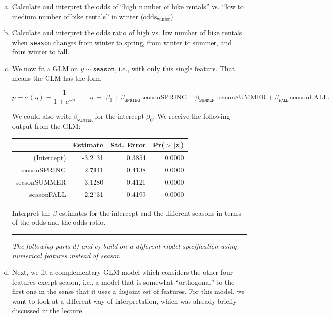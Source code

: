 {\vspace{-0.3cm}
\begin{enumerate}[a)]

	\item
    Calculate and interpret the odds of ``high number of bike rentals'' vs. ``low to medium number of bike rentals'' in winter ($\text{odds}_{\text{winter}}$).
    
	\item
    Calculate and interpret the odds ratio of high vs. low number of bike rentals when \texttt{season} changes from winter to spring, from winter to summer, and from winter to fall.
    
	\item\label{ex:logreg_GLM_single_feature}
    We now fit a GLM on $y \sim \texttt{season}$, i.e., with only this single feature.
    That means the GLM has the form

    \[
    p=\sigma(\eta)=\frac{1}{1+e^{-\eta}}
    \qquad
    \eta \;=\;
    \beta_0
    + \beta_{\texttt{SPRING}} \,\text{seasonSPRING}
    + \beta_{\texttt{SUMMER}} \,\text{seasonSUMMER}
    + \beta_{\texttt{FALL}} \,\text{seasonFALL}.
    \]

    We could also write \(\beta_{\texttt{WINTER}}\) for the intercept \(\beta_0\).
    We receive the following output from the GLM:
    
	\begin{table}[H]
		\centering
		\begin{tabular}{rrrr}
			\hline
			& Estimate & Std. Error & Pr($>$$|$z$|$) \\ 
			\hline
			(Intercept) & -3.2131 & 0.3854 & 0.0000 \\ 
			seasonSPRING & 2.7941 & 0.4138 & 0.0000 \\ 
			seasonSUMMER & 3.1280 & 0.4121 & 0.0000 \\ 
			seasonFALL & 2.2731 & 0.4199 & 0.0000 \\ 
			\hline
		\end{tabular}
	\end{table}

	Interpret the $\beta$-estimates for the intercept and the different seasons in terms of the odds and the odds ratio. 

    \bigskip
    \noindent\rule{\textwidth}{0.4pt}
    \smallskip

    \textit{The following parts d) and e) build on a different model specification using numerical features instead of season.}

    \item\label{ex:logreg_GLM_more_features}
    Next, we fit a complementary GLM model which considers the other four features except season, i.e., a model that is somewhat ``orthogonal'' to the first one in the sense that it uses a disjoint set of features.
    For this model, we want to look at a different way of interpretation, which was already briefly discussed in the lecture.
    

\end{enumerate}}
